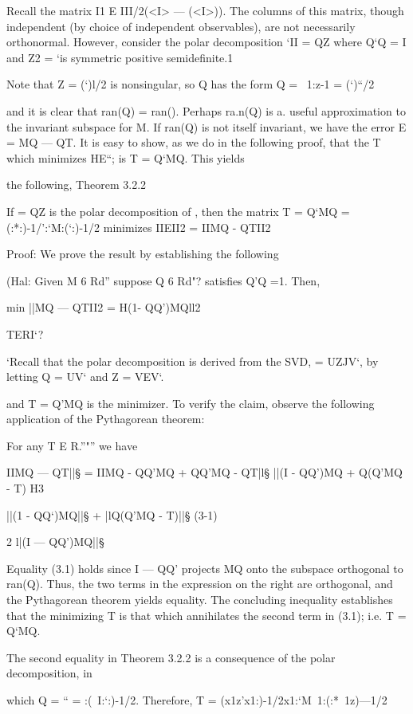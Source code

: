 Recall the matrix I1 E III/2(<I> — (<I>)). The columns of this matrix, though independent
(by choice of independent observables), are not necessarily orthonormal. However, consider the
polar decomposition ‘II = QZ where Q‘Q = I and Z2 = \Il‘\II is symmetric positive semideﬁnite.1

Note that Z = (\II‘\II)l/2 is nonsingular, so Q has the form
Q = ~1:z-1 = \II(\II‘\II)“/2

and it is clear that ran(Q) = ran(\II). Perhaps ra.n(Q) is a. useful approximation to the invariant
subspace for M. If ran(Q) is not itself invariant, we have the error E = MQ — QT. It is easy to
show, as we do in the following proof, that the T which minimizes HE“; is T = Q‘MQ. This yields

the following,
Theorem 3.2.2

If  = QZ is the polar decomposition of \II, then the matrix
T = Q‘MQ = (\1:*\1:)-1/’\1:‘M\I:(\Ir‘\I:)-1/2
minimizes IIEII2 = IIMQ - QTII2

Proof:
We prove the result by establishing the following

(Hal: Given M 6 Rd” suppose Q 6 Rd"? satisﬁes Q'Q =1. Then,

min ||MQ — QTII2 = H(1- QQ')MQll2

TERI‘?

‘Recall that the polar decomposition is derived from the SVD, \II = UZJV‘, by letting Q = UV‘ and Z = VEV‘.

and T = Q’MQ is the minimizer.
To verify the claim, observe the following application of the Pythagorean theorem:

For any T E R.”"” we have

IIMQ — QT||§ = IIMQ - QQ'MQ + QQ'MQ - QT|l§
||(I - QQ’)MQ + Q(Q'MQ - T) H3

||(1 - QQ‘)MQ||§ + |lQ(Q'MQ - T)||§ (3-1)

2 l|(I — QQ')MQ||§

Equality (3.1) holds since I — QQ' projects MQ onto the subspace orthogonal to ran(Q). Thus,
the two terms in the expression on the right are orthogonal, and the Pythagorean theorem yields
equality. The concluding inequality establishes that the minimizing T is that which annihilates the
second term in (3.1); i.e. T = Q‘MQ.

The second equality in Theorem 3.2.2 is a consequence of the polar decomposition, in

which Q = \IIZ“ = \I:(~I:‘\I:)-1/2. Therefore,
T = (x1z'x1:)-1/2x1:‘M~1:(\1:*~1z)—1/2

